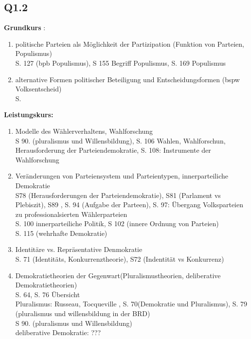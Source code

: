 \documentclass[12pt, letterpaper]{article}
\begin{document}
\subsection{Q1.2}
\label{sec:Q1.2}
\textbf{Grundkurs} :\\
\begin{enumerate}
  \item politische Parteien als Möglichkeit der Partizipation (Funktion von Parteien, Populismus)\\
    S. 127 (bpb Populismus), S 155 Begriff Populismus, S. 169 Populismus
  \item alternative Formen politischer Beteiligung und Entscheidungsformen (bspw Volksentscheid)\\
    S. 
\end{enumerate}

\textbf{Leistungskurs:} \\
\begin{enumerate}
  \item Modelle des Wählerverhaltens, Wahlforschung\\
    S 90. (pluralismus und Willensbildung), S. 106 Wahlen, Wahlforschun, Herausforderung der Parteiendemokratie,
    S. 108: Instrumente der Wahlforschung
  \item Veränderungen von Parteiensystem und Parteientypen, innerparteiliche Demokratie\\
    S78 (Herausforderungen der Parteiendemokratie), S81 (Parlament vs Plebiszit), S89 , S. 94 (Aufgabe der Parteen), S. 97: Übergang Volksparteien zu professionalsierten Wählerparteien\\
    S. 100 innerparteiliche Politik, S 102 (innere Ordnung von Parteien)\\
    S. 115 (wehrhafte Demokratie)


  \item Identitäre vs. Repräsentative Denmokratie\\
    S. 71 (Identitäts, Konkurrenztheorie), S72 (Indentität vs Konkurrenz)
  \item Demokratietheorien der Gegenwart(Pluralismustheorien, deliberative Demokratietheorien)\\
    S. 64, S. 76 Übersicht\\
    Pluralismus: Russeau, Tocqueville , S. 70(Demokratie und Pluralismus), S. 79 (pluralismus und willensbildung in der BRD)\\
    S 90. (pluralismus und Willensbildung)\\
    deliberative Demokratie: ???\\
\end{enumerate}
\end{document}
